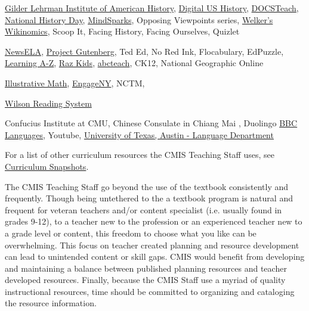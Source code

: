\begin{findings}

\href{http://www.gilderlehrman.org/programs-exhibitions/for-students}{Gilder Lehrman Institute of American History}, \href{http://www.digitalhistory.uh.edu/}{Digital US History},  \href{https://www.docsteach.org/}{DOCSTeach}, \href{http://nhd.org/}{National History Day}, \href{http://www.mindsparks.com/c/mindsparks.web?nocache@1+s@wS_b7B8iF3AX2}{MindSparks}, Opposing Viewpoints series, \href{http://www.welkerswikinomics.com/home.html}{Welker's Wikinomics}, Scoop It, Facing History, Facing Ourselves, Quizlet 


\href{https://newsela.com/}{NewsELA}, \href{https://www.gutenberg.org/}{Project Gutenberg}, Ted Ed, No Red Ink, Flocabulary, EdPuzzle, \href{https://www.learninga-z.com/}{Learning A-Z}, \href{https://www.raz-kids.com/}{Raz Kids}, \href{http://www.abcteach.com/}{abcteach}, CK12, National Geographic Online 


\href{https://www.illustrativemathematics.org/}{Illustrative Math}, \href{https://www.engageny.org/}{EngageNY}, NCTM, 


\href{http://www.wilsonlanguage.com/programs/wilson-reading-system/}{Wilson Reading System} 


Confucius Institute at CMU, Chinese Consulate in Chiang Mai , Duolingo
\href{http://www.bbc.co.uk/languages/}{BBC Languages}, Youtube, \href{http://coerll.utexas.edu/coerll/materials}{University of Texas, Austin - Language Department} 

For a list of other curriculum resources the CMIS Teaching Staff uses, see \href{https://docs.google.com/a/cmis.ac.th/document/d/1lgeGB0P5Y9FtDV_dacRy5qcta6My6I2HbSK-ukVlxUs/edit?usp=sharing}{Curriculum Snapshots}.


The CMIS Teaching Staff go beyond the use of the textbook consistently and frequently. Though being untethered to the a textbook program is natural and frequent for veteran teachers and/or content specialist (i.e. usually found in grades 9-12), to a teacher new to the profession or an experienced teacher new to a grade level or content, this freedom to choose what you like can be overwhelming. This focus on teacher created planning and resource development can lead to unintended content or skill gaps. CMIS would benefit from developing and maintaining a balance between published planning resources and teacher developed resources. Finally, because the CMIS Staff use a myriad of quality instructional resources, time should be committed to organizing and cataloging the resource information. 
\end{findings}

